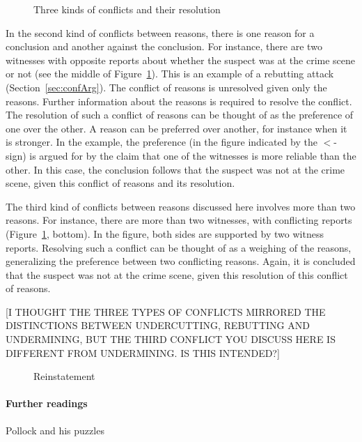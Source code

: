 \documentclass[10pt]{article}
\begin{document}
\begin{figure}[bt]
\centering

\caption{Three kinds of conflicts and their resolution\label{fig:conflicts}}
\end{figure}

In the second kind of conflicts between reasons, there is one reason for a conclusion and another against the conclusion. For instance, there are two witnesses with opposite reports about whether the suspect was at the crime scene or not (see the middle of Figure~\ref{fig:conflicts}). This is an example of a rebutting attack (Section~\ref{sec:confArg}). The conflict of reasons is unresolved given only the reasons. Further information about the reasons is required to resolve the conflict. The resolution of such a conflict of reasons can be thought of as the preference of one over the other. A reason can be preferred over another, for instance when it is stronger. In the example, the preference (in the figure indicated by the $<$-sign) is argued for by the claim that one of the witnesses is more reliable than the other. In this case, the conclusion follows that the suspect was not at the crime scene, given this conflict of reasons and its resolution. 

The third kind of conflicts between reasons discussed here involves more than two reasons. For instance, there are more than two witnesses, with conflicting reports (Figure~\ref{fig:conflicts}, bottom). In the figure, both sides are supported by two witness reports. Resolving such a conflict can be thought of as a weighing of the reasons, generalizing the preference between two conflicting reasons. Again, it is concluded that the suspect was not at the crime scene, given this resolution of this conflict of reasons.

[I THOUGHT THE THREE TYPES OF CONFLICTS MIRRORED THE DISTINCTIONS BETWEEN UNDERCUTTING, REBUTTING AND UNDERMINING, 
BUT THE THIRD CONFLICT YOU DISCUSS HERE IS DIFFERENT FROM UNDERMINING. IS THIS INTENDED?]




\begin{figure}[bt]
\centering

\caption{Reinstatement\label{fig:reinstatement}}
\end{figure}


\paragraph{Further readings}
Pollock and his puzzles
\end{document}
